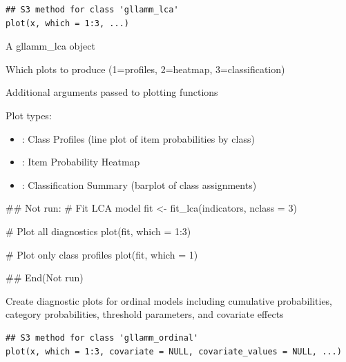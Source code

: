 \documentclass[a4paper]{book}
\begin{document}
%
\begin{Usage}
\begin{verbatim}
## S3 method for class 'gllamm_lca'
plot(x, which = 1:3, ...)
\end{verbatim}
\end{Usage}
%
\begin{Arguments}
\begin{ldescription}
\item[\code{x}] A gllamm\_lca object

\item[\code{which}] Which plots to produce (1=profiles, 2=heatmap, 3=classification)

\item[\code{...}] Additional arguments passed to plotting functions
\end{ldescription}
\end{Arguments}
%
\begin{Details}
Plot types:
\begin{itemize}

\item{} : Class Profiles (line plot of item probabilities by class)
\item{} : Item Probability Heatmap
\item{} : Classification Summary (barplot of class assignments)

\end{itemize}

\end{Details}
%
\begin{Examples}
\begin{ExampleCode}
## Not run: 
# Fit LCA model
fit <- fit_lca(indicators, nclass = 3)

# Plot all diagnostics
plot(fit, which = 1:3)

# Plot only class profiles
plot(fit, which = 1)

## End(Not run)

\end{ExampleCode}
\end{Examples}
%
\begin{Description}
Create diagnostic plots for ordinal models including cumulative probabilities,
category probabilities, threshold parameters, and covariate effects
\end{Description}
%
\begin{Usage}
\begin{verbatim}
## S3 method for class 'gllamm_ordinal'
plot(x, which = 1:3, covariate = NULL, covariate_values = NULL, ...)
\end{verbatim}
\end{Usage}
\end{document}
